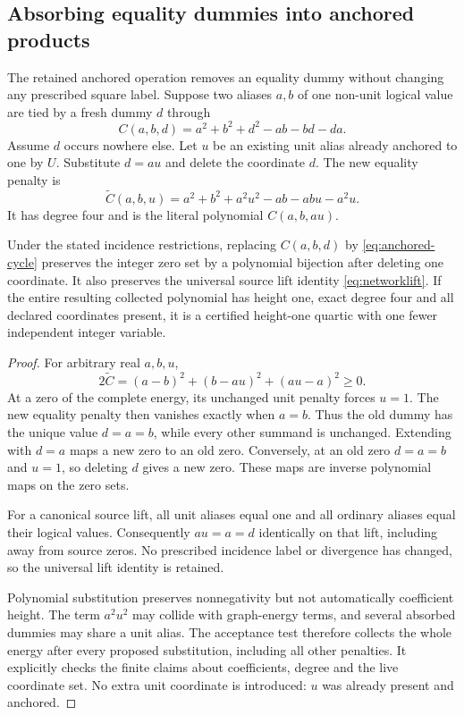 \subsection{Absorbing equality dummies into anchored products}
The retained anchored operation removes an equality dummy without changing any
prescribed square label. Suppose two aliases $a,b$ of one non-unit logical
value are tied by a fresh dummy $d$ through
\[
 C(a,b,d)=a^2+b^2+d^2-ab-bd-da.
\]
Assume $d$ occurs nowhere else. Let $u$ be an existing unit alias already
anchored to one by $U$. Substitute $d=au$ and delete the coordinate $d$.
The new equality penalty is
\begin{equation}\label{eq:anchored-cycle}
 \widetilde C(a,b,u)
 =a^2+b^2+a^2u^2-ab-abu-a^2u.
\end{equation}
It has degree four and is the literal polynomial $C(a,b,au)$.

\begin{theorem}\label{thm:anchored-equality}
Under the stated incidence restrictions, replacing $C(a,b,d)$ by
\eqref{eq:anchored-cycle} preserves the integer zero set by a polynomial
bijection after deleting one coordinate. It also preserves the universal
source lift identity \eqref{eq:networklift}. If the entire resulting
collected polynomial has height one, exact degree four and all declared
coordinates present, it is a certified height-one quartic with one fewer
independent integer variable.
\end{theorem}
\begin{proof}
For arbitrary real $a,b,u$,
\[
 2\widetilde C=(a-b)^2+(b-au)^2+(au-a)^2\ge0.
\]
At a zero of the complete energy, its unchanged unit penalty forces
$u=1$. The new equality penalty then vanishes exactly when $a=b$.
Thus the old dummy has the unique value $d=a=b$, while every other
summand is unchanged. Extending with $d=a$ maps a new zero to an old
zero. Conversely, at an old zero $d=a=b$ and $u=1$, so deleting $d$
gives a new zero. These maps are inverse polynomial maps on the zero sets.

For a canonical source lift, all unit aliases equal one and all ordinary
aliases equal their logical values. Consequently $au=a=d$ identically
on that lift, including away from source zeros. No prescribed incidence
label or divergence has changed, so the universal lift identity is retained.

Polynomial substitution preserves nonnegativity but not automatically
coefficient height. The term $a^2u^2$ may collide with graph-energy terms,
and several absorbed dummies may share a unit alias. The acceptance test
therefore collects the whole energy after every proposed substitution,
including all other penalties. It explicitly checks the finite claims
about coefficients, degree and the live coordinate set. No extra unit
coordinate is introduced: $u$ was already present and anchored.
\end{proof}

